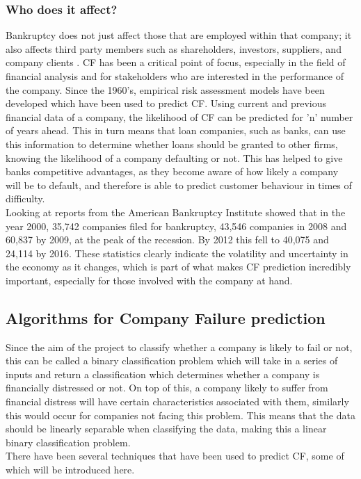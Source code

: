 \documentclass[11pt]{article}
\begin{document}
\subsubsection{Who does it affect?}
Bankruptcy does not just affect those that are employed within that company; it also affects third party members such as shareholders, investors, suppliers, and company clients . CF has been a critical point of focus, especially in the field of financial analysis and for stakeholders who are interested in the performance of the company. Since the 1960's, empirical risk assessment models have been developed which have been used to predict CF. Using current and previous financial data of a company, the likelihood of CF can be predicted for 'n' number of years ahead. This in turn means that loan companies, such as banks, can use this information to determine whether loans should be granted to other firms, knowing the likelihood of a company defaulting or not. This has helped to give banks competitive advantages, as they become aware of how likely a company will be to default, and therefore is able to predict customer behaviour in times of difficulty.\\
Looking at reports from the American Bankruptcy Institute showed that in the year 2000, 35,742 companies filed for bankruptcy, 43,546 companies in 2008 and 60,837 by 2009, at the peak of the recession. By 2012 this fell to 40,075 and 24,114 by 2016. These statistics clearly indicate the volatility and uncertainty in the economy as it changes, which is part of what makes CF prediction incredibly important, especially for those involved with the company at hand.

\subsection{Algorithms for Company Failure prediction}
Since the aim of the project to classify whether a company is likely to fail or not, this can be called a binary classification problem which will take in a series of inputs and return a classification which determines whether a company is financially distressed or not. On top of this, a company likely to suffer from financial distress will have certain characteristics associated with them, similarly this would occur for companies not facing this problem. This means that the data should be linearly separable when classifying the data, making this a linear binary classification problem. \\
There have been several techniques that have been used to predict CF, some of which will be introduced here.  
\end{document}
